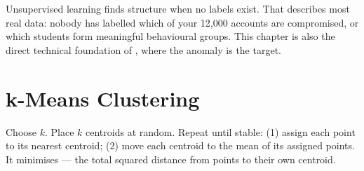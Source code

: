 Unsupervised learning finds structure when no labels exist. That describes most
real data: nobody has labelled which of your 12{,}000 accounts are compromised, or
which students form meaningful behavioural groups. This chapter is also the direct
technical foundation of , where the anomaly is the target.

\section{k-Means Clustering}

\begin{definitionbox}[k-Means]
Choose $k$. Place $k$ centroids at random. Repeat until stable: (1) assign each
point to its nearest centroid; (2) move each centroid to the mean of its assigned
points. It minimises  --- the total squared distance from points to
their own centroid.
\end{definitionbox}

